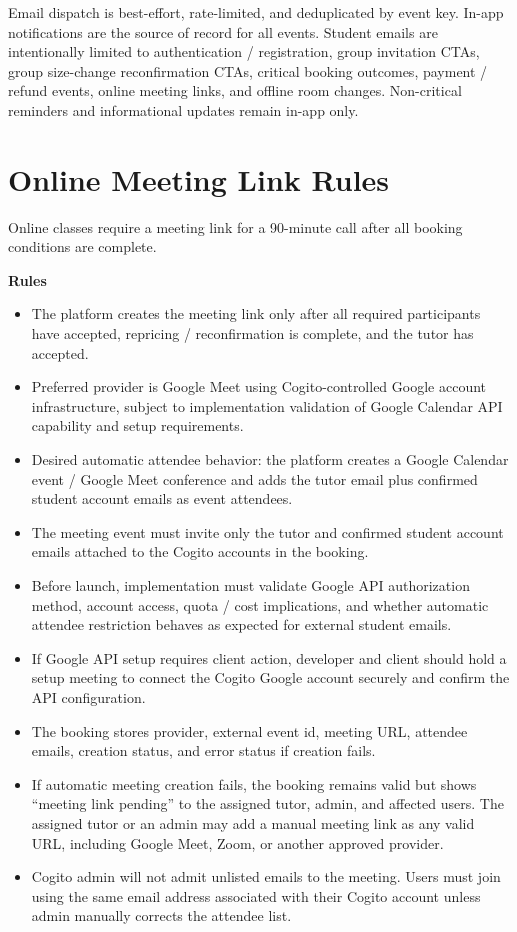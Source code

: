 \documentclass[11pt,a4paper]{article}
\begin{document}
Email dispatch is best-effort, rate-limited, and deduplicated by event key. In-app notifications are the source of record for all events. Student emails are intentionally limited to authentication / registration, group invitation CTAs, group size-change reconfirmation CTAs, critical booking outcomes, payment / refund events, online meeting links, and offline room changes. Non-critical reminders and informational updates remain in-app only.

\section{Online Meeting Link Rules}

Online classes require a meeting link for a 90-minute call after all booking conditions are complete.

\textbf{Rules}
\begin{itemize}
    \item The platform creates the meeting link only after all required participants have accepted, repricing / reconfirmation is complete, and the tutor has accepted.
    \item Preferred provider is Google Meet using Cogito-controlled Google account infrastructure, subject to implementation validation of Google Calendar API capability and setup requirements.
    \item Desired automatic attendee behavior: the platform creates a Google Calendar event / Google Meet conference and adds the tutor email plus confirmed student account emails as event attendees.
    \item The meeting event must invite only the tutor and confirmed student account emails attached to the Cogito accounts in the booking.
    \item Before launch, implementation must validate Google API authorization method, account access, quota / cost implications, and whether automatic attendee restriction behaves as expected for external student emails.
    \item If Google API setup requires client action, developer and client should hold a setup meeting to connect the Cogito Google account securely and confirm the API configuration.
    \item The booking stores provider, external event id, meeting URL, attendee emails, creation status, and error status if creation fails.
    \item If automatic meeting creation fails, the booking remains valid but shows ``meeting link pending'' to the assigned tutor, admin, and affected users. The assigned tutor or an admin may add a manual meeting link as any valid URL, including Google Meet, Zoom, or another approved provider.
    \item Cogito admin will not admit unlisted emails to the meeting. Users must join using the same email address associated with their Cogito account unless admin manually corrects the attendee list.
\end{itemize}
\end{document}
